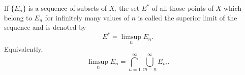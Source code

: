 If $\{E_n\}$ is a sequence of subsets of $X$, the set $E^*$ of all those points of $X$ which belong to $E_n$ for infinitely many values of $n$ is called the superior limit of the sequence and is denoted by
$$E^* = \limsup_n E_n.$$
Equivalently,
$$\limsup_n E_n = \bigcap_{n=1}^{\infty} \bigcup_{m=n}^{\infty} E_m.$$
